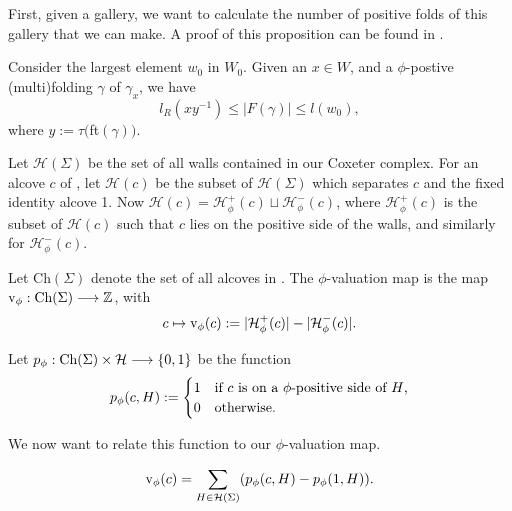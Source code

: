 \documentclass[11pt]{article}
\begin{document}
First, given a gallery, we want to calculate the number of positive folds of this gallery that we can make. A proof of this proposition can be found in \cite{DEL}.

\begin{proposition}
    Consider the largest element $w_0$ in $W_0$. Given an $x\in W$, and a $\phi$-postive (multi)folding $\gamma$ of $\gamma_x$, we have
    \[l_R(xy^{-1})\leq |F(\gamma)|\leq l(w_0),\]
    where $y:=\tau($ft$(\gamma))$.
\end{proposition}


\begin{definition}
    Let $\mathcal{H}(\Sigma)$ be the set of all walls contained in our Coxeter complex. For an alcove $c$ of \sg, let $\mathcal{H}(c)$ be the subset of $\mathcal{H}(\Sigma)$ which separates $c$ and the fixed identity alcove 1. Now $\mathcal{H}(c)=\mathcal{H}_{\phi}^+(c)\sqcup \mathcal{H}_{\phi}^-(c)$, where $\mathcal{H}_{\phi}^+(c)$ is the subset of $\mathcal{H}(c)$ such that $c$ lies on the positive side of the walls, and similarly for $\mathcal{H}_{\phi}^-(c)$.
\end{definition}


\begin{definition}
    Let Ch$(\Sigma)$ denote the set of all alcoves in \sg. The $\phi$-valuation map is the map $\textnormal{v}_\phi:\textnormal{Ch}(\Sigma)\longrightarrow\mathbb{Z}$, with
    \[c\mapsto \textnormal{v}_\phi(c):= |\mathcal{H}_{\phi}^+(c)|-|\mathcal{H}_{\phi}^-(c)|.\]
\end{definition}

\begin{definition}
    Let $p_\phi : \textnormal{Ch}(\Sigma)\times \mathcal{H}\longrightarrow \{0,1\}$ be the function 
    \[p_\phi(c,H):= \begin{cases}
        1 & \textnormal{if $c$ is on a $\phi$-positive side of $H$,}\\
        0 & \textnormal{otherwise.}
    \end{cases}\]
\end{definition}

We now want to relate this function to our $\phi$-valuation map.

\begin{lemma}
    \[\textnormal{v}_\phi(c)=\sum_{H\in\mathcal{H}(\Sigma)}(p_{\phi}(c,H)-p_\phi(1,H)).\]
\end{lemma}
\end{document}
